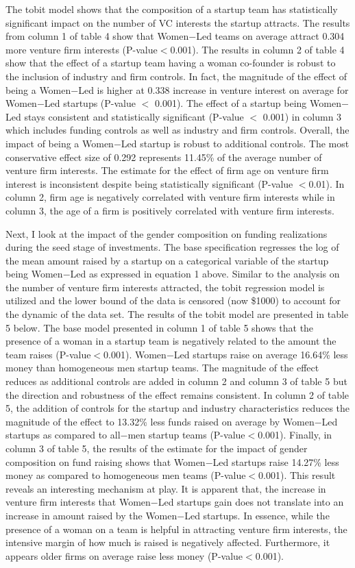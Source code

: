The tobit model shows that the composition of a startup team has statistically significant impact on the number of VC interests the startup attracts. The results from column 1 of table 4 show that Women$-$Led teams on average attract 0.304 more venture firm interests (P-value$<$0.001). The results in column 2 of table 4 show that the effect of a startup team having a woman co-founder is robust to the inclusion of industry and firm controls. In fact, the magnitude of the effect of being a Women$-$Led is higher at 0.338 increase in venture interest on average for Women$-$Led startups (P-value $<$ 0.001). The effect of a startup being Women$-$Led stays consistent and statistically significant (P-value $<$ 0.001) in column 3 which includes funding controls as well as industry and firm controls. Overall, the impact of being a Women$-$Led startup is robust to additional controls. The most conservative effect size of 0.292 represents 11.45\% of the average number of venture firm interests. The estimate for the effect of firm age on venture firm interest is inconsistent despite being statistically significant (P-value $<$0.01). In column 2, firm age is negatively correlated with venture firm interests while in column 3, the age of a firm is positively correlated with venture firm interests. 

Next, I look at the impact of the gender composition on funding realizations during the seed stage of investments. The base specification regresses the log of the mean amount raised by a startup on a categorical variable of the startup being Women$-$Led as expressed in equation 1 above. Similar to the analysis on the number of venture firm interests attracted, the tobit regression model is utilized and the lower bound of the data is censored (now \$1000) to account for the dynamic of the data set. The results of the tobit model are presented in table 5 below. The base model presented in column 1 of table 5 shows that the presence of a woman in a startup team is negatively related to the amount the team raises (P-value$<$0.001). Women$-$Led startups raise on average 16.64\% less money than homogeneous men startup teams. The magnitude of the effect reduces as additional controls are added in column 2 and column 3 of table 5 but the direction and robustness of the effect remains consistent. In column 2 of table 5, the addition of controls for the startup and industry characteristics reduces the magnitude of the effect to 13.32\% less funds raised on average by Women$-$Led startups as compared to all$-$men startup teams (P-value$<$0.001). Finally, in column 3 of table 5, the results of the estimate for the impact of gender composition on fund raising shows that Women$-$Led startups raise 14.27\% less money as compared to homogeneous men teams (P-value$<$0.001). This result reveals an interesting mechanism at play. It is apparent that, the increase in venture firm interests that Women$-$Led startups gain does not translate into an increase in amount raised by the Women$-$Led startups. In essence, while the presence of a woman on a team is helpful in attracting venture firm interests, the intensive margin of how much is raised is negatively affected. Furthermore, it appears older firms on average raise less money (P-value$<$0.001).

